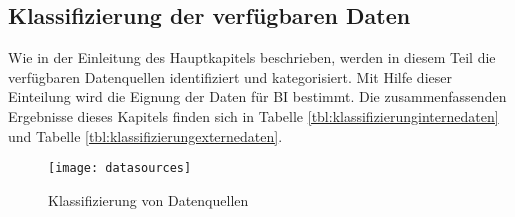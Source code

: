 \subsection{Klassifizierung der verfügbaren Daten} \label{toc:klassifizierungderdaten}

Wie in der Einleitung des Hauptkapitels beschrieben, werden in diesem Teil die verfügbaren Datenquellen identifiziert und
kategorisiert. Mit Hilfe dieser Einteilung wird die Eignung der Daten für \ac{BI} bestimmt. Die zusammenfassenden Ergebnisse
dieses Kapitels finden sich in Tabelle \ref{tbl:klassifizierunginternedaten} und Tabelle \ref{tbl:klassifizierungexternedaten}.

\begin{figure}[H]
    \caption{Klassifizierung von Datenquellen}
    \texttt{[image: datasources]}
    \label{figure:datasources}
    \\
    \cite[Quelle: In Anlehnung an][Abb. 1]{hartmann2016capturing}
\end{figure}

